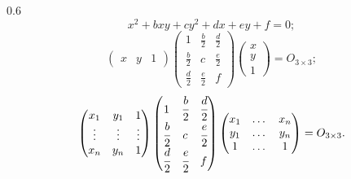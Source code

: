 \documentclass{beamer}
\begin{document}
\begin{frame}
\begin{columns}
            \begin{column}
                {0.6\linewidth}
                $$x^2 + bxy +cy^2+dx+ey+f=0;$$
                $$\begin{pmatrix}
                    x & y & 1
                \end{pmatrix}
                \begin{pmatrix}
                    1 & \frac{b}{2} & \frac{d}{2} \\
                    \frac{b}{2} & c & \frac{e}{2} \\
                    \frac{d}{2} & \frac{e}{2} & f
                \end{pmatrix}
                \begin{pmatrix}
                    x\\y\\1
                \end{pmatrix} = O_{3\times3};$$
                \begin{align*}
                    \begin{pmatrix}
                        x_1 & y_1 & 1 \\
                        \vdots & \vdots & \vdots \\
                        x_n & y_n & 1
                    \end{pmatrix}
                    \begin{pmatrix}
                        1 & \cfrac{b}{2} & \cfrac{d}{2} \\
                        \cfrac{b}{2} & c & \cfrac{e}{2} \\
                        \cfrac{d}{2} & \cfrac{e}{2} & f
                    \end{pmatrix}
                    \begin{pmatrix}
                        x_1 & \dots & x_n\\y_1 & \dots & y_n\\1 & \dots &1
                    \end{pmatrix} = O_{3\times3}.
                \end{align*}
            \end{column}
        \end{columns}
    
    \end{frame}
\end{document}

